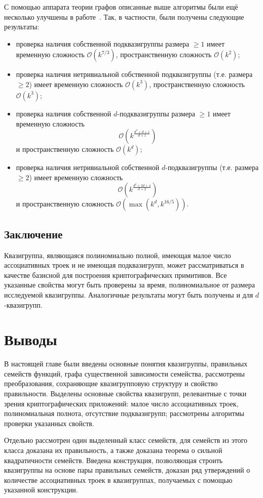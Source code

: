     С помощью аппарата теории графов описанные выше алгоритмы были ещё несколько улучшены в работе~\cite{mazurin23}.
    Так, в частности, были получены следующие результаты:
    \begin{itemize}
        \item проверка наличия собственной подквазигруппы размера $\ge 1$ имеет временную сложность $\mathcal{O}(k^{7/3})$, пространственную сложность $\mathcal{O}(k^{2})$;
        \item проверка наличия нетривиальной собственной подквазигруппы (т.е. размера $\ge 2$) имеет временную сложность $\mathcal{O}(k^{3})$, пространственную сложность $\mathcal{O}(k^{3})$;
        \item проверка наличия собственной $d$-подквазигруппы размера $\ge 1$ имеет временную сложность 
        \[
            \mathcal{O} \left( k^{\frac{d^2 + d + 1}{d + 1}} \right)
        \]
        и пространственную сложность $\mathcal{O}(k^{d})$;
        \item проверка наличия нетривиальной собственной $d$-подквазигруппы (т.е. размера $\ge 2$) имеет временную сложность 
        \[
            \mathcal{O} \left( k^{\frac{d^2 + 2d + 4}{d + 2}} \right)
        \]
        и пространственную сложность $\mathcal{O}\left( \max \left(k^{d}, k^{16/5} \right) \right)$.
    \end{itemize}

\subsection{Заключение}

    Квазигруппа, являющаяся полиномиально полной, имеющая малое число ассоциативных троек и не имеющая подквазигрупп, может рассматриваться в качестве базисной для построения криптографических примитивов.
    Все указанные свойства могут быть проверены за время, полиномиальное от размера исследуемой квазигруппы.
    Аналогичные результаты могут быть получены и для $d$-квазигрупп.


\section*{Выводы}

    В настоящей главе были введены основные понятия квазигруппы, правильных семейств функций, графа существенной зависимости семейства, рассмотрены преобразования, сохраняющие квазигрупповую структуру и свойство правильности.
    Выделены основные свойства квазигрупп, релевантные с точки зрения криптографических приложений: малое число ассоциативных троек, полиномиальная полнота, отсутствие подквазигрупп; рассмотрены алгоритмы проверки указанных свойств.

    Отдельно рассмотрен один выделенный класс семейств, для семейств из этого класса доказана их правильность, а также доказана теорема о сильной квадратичности семейств.
    Введена конструкция, позволяющая строить квазигруппы на основе пары правильных семейств, доказан ряд утверждений о количестве ассоциативных троек в квазигруппах, получаемых с помощью указанной конструкции.